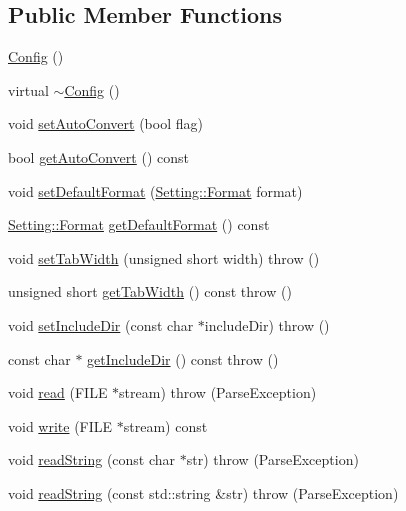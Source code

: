 \subsection*{Public Member Functions}
\begin{DoxyCompactItemize}
\item 
\hyperlink{classlibconfig_1_1_config_ae4e8fa08259da2a1a222e9d04eb42fb1}{Config} ()
\item 
virtual \hyperlink{classlibconfig_1_1_config_a5d94e935833746061f33d58261365f55}{$\sim$Config} ()
\item 
void \hyperlink{classlibconfig_1_1_config_aa021f72ce9742f27bf7b5d62c9cb57b5}{setAutoConvert} (bool flag)
\item 
bool \hyperlink{classlibconfig_1_1_config_a4986e712dd553c3b9f511a98ada42817}{getAutoConvert} () const 
\item 
void \hyperlink{classlibconfig_1_1_config_ad821267b5bd7e4642040a5fe234dcf15}{setDefaultFormat} (\hyperlink{classlibconfig_1_1_setting_a35034c3fd8c1b2e8e590b6f53083106e}{Setting::Format} format)
\item 
\hyperlink{classlibconfig_1_1_setting_a35034c3fd8c1b2e8e590b6f53083106e}{Setting::Format} \hyperlink{classlibconfig_1_1_config_affc4cebbf4922d05e0bab5a9e3c25c26}{getDefaultFormat} () const 
\item 
void \hyperlink{classlibconfig_1_1_config_aefc250cedb4d03740e43e734913a05ee}{setTabWidth} (unsigned short width)  throw ()
\item 
unsigned short \hyperlink{classlibconfig_1_1_config_a49af806089ff70317745e660ac1d5ad4}{getTabWidth} () const   throw ()
\item 
void \hyperlink{classlibconfig_1_1_config_aa5a069b2d79157f53fde553295ffff37}{setIncludeDir} (const char $\ast$includeDir)  throw ()
\item 
const char $\ast$ \hyperlink{classlibconfig_1_1_config_ae4b7acff869245197eed53f800f3fe4f}{getIncludeDir} () const   throw ()
\item 
void \hyperlink{classlibconfig_1_1_config_a468e6ef4c2e36bdd57fc23708dee69a1}{read} (FILE $\ast$stream)  throw (ParseException)
\item 
void \hyperlink{classlibconfig_1_1_config_a015b1433153ab1a8c5bb05b4bb96dc46}{write} (FILE $\ast$stream) const 
\item 
void \hyperlink{classlibconfig_1_1_config_af3076c6839fa256bef1ad3fc33e17f98}{readString} (const char $\ast$str)  throw (ParseException)
\item 
void \hyperlink{classlibconfig_1_1_config_a19da31ba3ee31992a6ddbd6e079d629a}{readString} (const std::string \&str)  throw (ParseException)

\end{DoxyCompactItemize}
